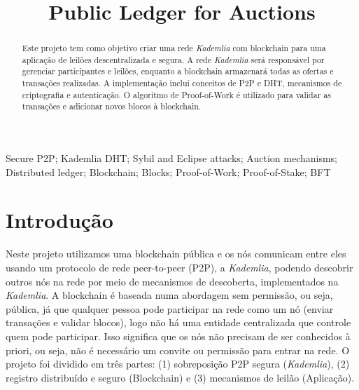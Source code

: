 \documentclass[conference]{IEEEtran}
\begin{document}
    \title{Public Ledger for Auctions}

    \author{
    \and
    \and
    }

    \maketitle
    \begin{abstract}
        Este projeto tem como objetivo criar uma rede \textit{Kademlia} com blockchain para uma aplicação de leilões descentralizada e segura. A rede \textit{Kademlia} será responsável por gerenciar participantes e leilões, enquanto a blockchain armazenará todas as ofertas e transações realizadas. A implementação inclui conceitos de P2P e DHT, mecanismos de criptografia e autenticação. O algoritmo de Proof-of-Work é utilizado para validar as transações e adicionar novos blocos à blockchain.

    \end{abstract}


    \begin{IEEEkeywords}
        Secure P2P; Kademlia DHT; Sybil and Eclipse attacks; Auction mechanisms; Distributed ledger; Blockchain; Blocks; Proof-of-Work; Proof-of-Stake; BFT
    \end{IEEEkeywords}


    \section{Introdução}
    Neste projeto utilizamos uma blockchain pública e os nós comunicam entre eles usando um protocolo de rede peer-to-peer (P2P), a \textit{Kademlia}, podendo descobrir outros nós na rede por meio de mecanismos de descoberta, implementados na \textit{Kademlia}. A blockchain é baseada numa abordagem sem permissão, ou seja, pública, já que qualquer pessoa pode participar na rede como um nó (enviar transações e validar blocos), logo não há uma entidade centralizada que controle quem pode participar. Isso significa que os nós não precisam de ser conhecidos à priori, ou seja, não é necessário um convite ou permissão para entrar na rede.
    O projeto foi dividido em três partes: (1) sobreposição P2P segura (\textit{Kademlia}), (2) registro distribuído e seguro (Blockchain) e (3) mecanismos de leilão (Aplicação).\\
\end{document}

